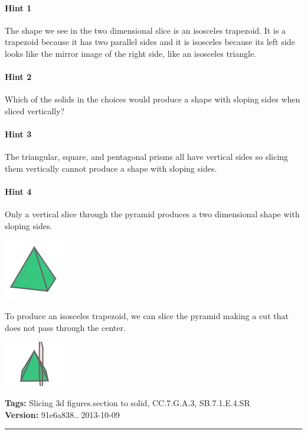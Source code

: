 \documentclass[twocolumn,10pt]{article}
\def\shrinkfactor{0.4}
\begin{document}
\paragraph{Hint 1}The shape we see in the two dimensional slice is an isosceles trapezoid. It is a trapezoid because it has two parallel sides and it is isosceles because its left side looks like the mirror image of the right side, like an isosceles triangle.

\paragraph{Hint 2}Which of the solids in the choices would produce a shape with sloping sides when sliced vertically?

\paragraph{Hint 3}The triangular, square, and pentagonal prisms all have vertical sides so slicing them vertically cannot produce a shape with sloping sides.

\paragraph{Hint 4}Only a vertical slice through the pyramid produces a two dimensional shape with sloping sides.


\includegraphics[scale=\shrinkfactor]{figures/49b99cca0c4e580ceaef3d4fd5842ea463191ce8.png}

To produce an isosceles trapezoid, we can slice the pyramid making a cut that does not pass through the center.


\includegraphics[scale=\shrinkfactor]{figures/5c4f5d18cffbd9888619838aea65c59f3f17f1d0.png}



\medskip
\noindent
\textbf{Tags:} {\footnotesize Slicing 3d figures.section to solid, CC.7.G.A.3, SB.7.1.E.4.SR}\\
\textbf{Version:} 91e6a838.. 2013-10-09
\smallskip\hrule
\end{document}
